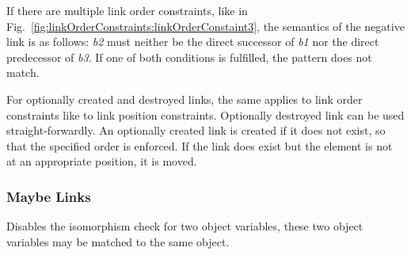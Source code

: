 If there are multiple link order constraints, like in Fig.~\ref{fig:linkOrderConstraints:linkOrderConstaint3}, the semantics of the negative link is as follows: \emph{b2} must neither be the direct successor of \emph{b1} nor the direct predecessor of \emph{b3}. If one of both conditions is fulfilled, the pattern does not match.


For optionally created and destroyed links, the same applies to link order constraints like to link position constraints. Optionally destroyed link can be used straight-forwardly. An optionally created link is created if it does not exist, so that the specified order is enforced. If the link does exist but the element is not at an appropriate position, it is moved.

\subsubsection{Maybe Links}

Disables the isomorphism check for two object variables, these two object variables may be matched to the same object.


